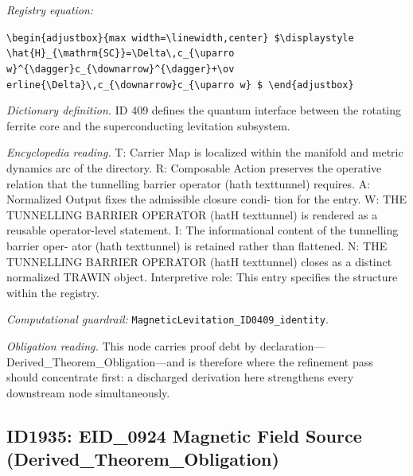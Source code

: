 \documentclass[11pt]{article}
\theoremstyle{remark}
\begin{document}
\noindent\textit{Registry equation:}\par
{\small\texttt{\textbackslash{}begin\{adjustbox\}\{max width=\textbackslash{}linewidth,center\} \$\textbackslash{}displaystyle \textbackslash{}hat\{H\}\_\{\textbackslash{}mathrm\{SC\}\}=\textbackslash{}Delta\textbackslash{},c\_\{\textbackslash{}uparro w\}\textasciicircum{}\{\textbackslash{}dagger\}c\_\{\textbackslash{}downarrow\}\textasciicircum{}\{\textbackslash{}dagger\}+\textbackslash{}ov erline\{\textbackslash{}Delta\}\textbackslash{},c\_\{\textbackslash{}downarrow\}c\_\{\textbackslash{}uparro w\} \$ \textbackslash{}end\{adjustbox\}}}\par\medskip
\noindent\textit{Dictionary definition.} ID 409 defines the quantum interface between the rotating ferrite core and the superconducting levitation subsystem.\par\medskip
\noindent\textit{Encyclopedia reading.} T: Carrier Map is localized within the manifold and metric dynamics arc of the directory. R: Composable Action preserves the operative relation that the tunnelling barrier operator (hath texttunnel) requires. A: Normalized Output fixes the admissible closure condi- tion for the entry. W: THE TUNNELLING BARRIER OPERATOR (hatH texttunnel) is rendered as a reusable operator-level statement. I: The informational content of the tunnelling barrier oper- ator (hath texttunnel) is retained rather than flattened. N: THE TUNNELLING BARRIER OPERATOR (hatH texttunnel) closes as a distinct normalized TRAWIN object. Interpretive role: This entry specifies the structure within the registry.
\par\medskip\noindent\textit{Computational guardrail:} \texttt{MagneticLevitation\_ID0409\_identity}.
\par\medskip\noindent\textit{Obligation reading.} This node carries proof debt by declaration---Derived\_Theorem\_Obligation---and is therefore where the refinement pass should concentrate first: a discharged derivation here strengthens every downstream node simultaneously.

\subsection{ID1935: EID\_0924 Magnetic Field Source (Derived\_Theorem\_Obligation)}
\end{document}
